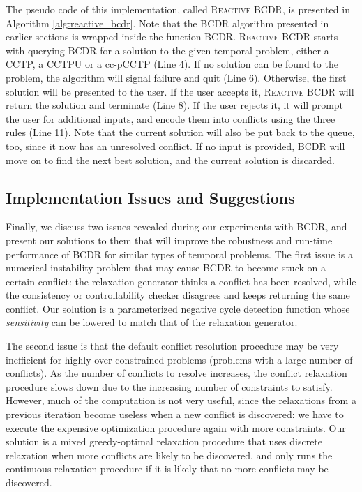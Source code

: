 \documentclass[jair,twoside,11pt,theapa]{article}
\begin{document}
The pseudo code of this implementation, called \textsc{Reactive BCDR}, is
presented in Algorithm \ref{alg:reactive_bcdr}. Note that the BCDR algorithm
presented in earlier sections is wrapped inside the function \textsc{BCDR}.
\textsc{Reactive BCDR} starts with querying \textsc{BCDR} for a solution to the
given temporal problem, either a CCTP, a CCTPU or a cc-pCCTP (Line 4). If no
solution can be found to the problem, the algorithm will signal failure and
quit (Line 6). Otherwise, the first solution will be presented to the user. If
the user accepts it, \textsc{Reactive BCDR} will return the solution and
terminate (Line 8). If the user rejects it, it will prompt the user for
additional inputs, and encode them into conflicts using the three rules (Line
11). Note that the current solution will also be put back to the queue, too,
since it now has an unresolved conflict. If no input is provided, BCDR will move
on to find the next best solution, and the current solution is discarded.





\subsection{Implementation Issues and Suggestions}


Finally, we discuss two issues revealed during our experiments with BCDR, and
present our solutions to them that will improve the robustness and run-time
performance of BCDR for similar types of temporal problems. The first issue is a
numerical instability problem that may cause BCDR to become stuck on a certain
conflict: the relaxation generator thinks a conflict has been resolved, while
the consistency or controllability checker disagrees and keeps returning the
same conflict. Our solution is a parameterized negative cycle detection function
whose \textit{sensitivity} can be lowered to match that of the relaxation generator.


The second issue is that the default conflict resolution procedure may be very
inefficient for highly over-constrained problems (problems with a large number
of conflicts). As the number of conflicts to resolve increases, the conflict
relaxation procedure slows down due to the increasing number of constraints to
satisfy. However, much of the computation is not very useful, since the
relaxations from a previous iteration become useless when a new conflict is
discovered: we have to execute the expensive optimization procedure again with
more constraints. Our solution is a mixed greedy-optimal relaxation
procedure that uses discrete relaxation when more conflicts are likely to be
discovered, and only runs the continuous relaxation procedure if it is likely
that no more conflicts may be discovered.
\end{document}
